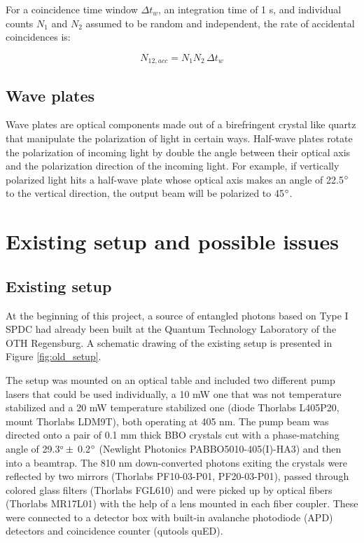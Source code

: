 \documentclass[a4paper,
DIV=13,
12pt,
BCOR=10mm,
department=FakEI,
twoside,
parskip=half,
automark,
logostyle=flat,
]{OTHRartcl}
\begin{document}
For a coincidence time window $\Delta t_w$, an integration time of 1 s, and individual counts $N_1$ and $N_2$ assumed to be random and independent, the rate of accidental coincidences is:

\begin{equation}
    N_{12,acc} = N_1 N_2\, \Delta t_w
    \label{accidental_coincidences}
\end{equation}


\subsection{Wave plates}

Wave plates are optical components made out of a birefringent crystal like quartz that manipulate the polarization of light in certain ways. Half-wave plates rotate the polarization of incoming light by double the angle between their optical axis and the polarization direction of the incoming light. For example, if vertically polarized light hits a half-wave plate whose optical axis makes an angle of 22.5$\degree$ to the vertical direction, the output beam will be polarized to 45$\degree$.








\section{Existing setup and possible issues}

\subsection{Existing setup}

At the beginning of this project, a source of entangled photons based on Type I SPDC had already been built at the Quantum Technology Laboratory of the OTH Regensburg. A schematic drawing of the existing setup is presented in Figure \ref{fig:old_setup}.

The setup was mounted on an optical table and included two different pump lasers that could be used individually, a 10 mW one that was not temperature stabilized and a 20 mW temperature stabilized one (diode Thorlabs L405P20, mount Thorlabs LDM9T), both operating at 405 nm. The pump beam was directed onto a pair of 0.1 mm thick BBO crystals cut with a phase-matching angle of 29.3$\degree\, \pm$ 0.2$\degree$ (Newlight Photonics PABBO5010-405(I)-HA3) and then into a beamtrap. The 810 nm down-converted photons exiting the crystals were reflected by two mirrors (Thorlabs PF10-03-P01, PF20-03-P01), passed through colored glass filters (Thorlabs FGL610) and were picked up by optical fibers (Thorlabs MR17L01) with the help of a lens mounted in each fiber coupler. These were connected to a detector box with built-in avalanche photodiode (APD) detectors and coincidence counter (qutools quED).
\end{document}
